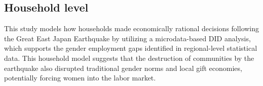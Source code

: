 \documentclass[12pt,halfline,a4paper]{ouparticle}
\begin{document}
\subsection{Household level}
\label{sec5.1}

This study models how households made economically rational decisions following the Great East Japan Earthquake by utilizing a microdata-based DID analysis, which supports the gender employment gaps identified in regional-level statistical data. This household model suggests that the destruction of communities by the earthquake also disrupted traditional gender norms and local gift economies, potentially forcing women into the labor market.

\nocite{*}

\end{document}
